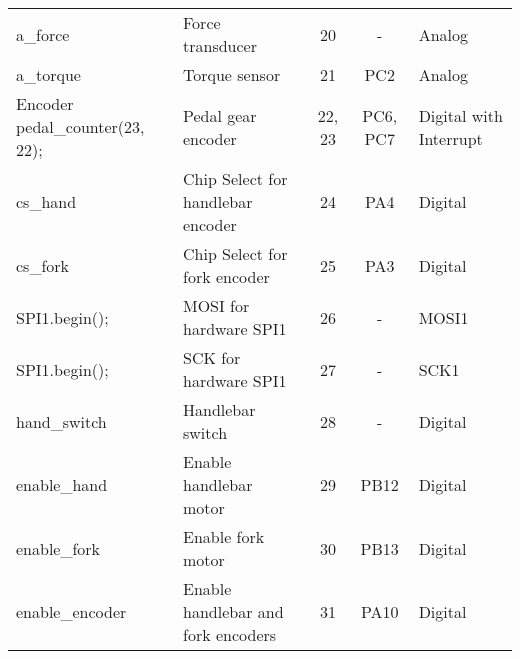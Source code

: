 \begin{table}
{\begin{tabular}{llccl}
a\_force                                               & Force transducer                    & 20                      & -                     & Analog                                                \\
a\_torque                                              & Torque sensor                       & 21                      & PC2                     & Analog                                                \\
Encoder pedal\_counter(23, 22);                        & Pedal gear encoder                  & 22, 23                  & PC6, PC7              & Digital with Interrupt                                \\
cs\_hand                                               & Chip Select for handlebar encoder   & 24                      & PA4                   & Digital                                               \\
cs\_fork                                               & Chip Select for fork encoder        & 25                      & PA3                   & Digital                                               \\
SPI1.begin();                                          & MOSI for hardware SPI1              & 26                      & -                     & MOSI1                                                 \\
SPI1.begin();                                          & SCK for hardware SPI1               & 27                      & -                     & SCK1                                                  \\
hand\_switch                                           & Handlebar switch                    & 28                      & -                     & Digital                                               \\
enable\_hand                                           & Enable handlebar motor              & 29                      & PB12                  & Digital                                               \\
enable\_fork                                           & Enable fork motor                   & 30                      & PB13                  & Digital                                               \\
enable\_encoder                                        & Enable handlebar and fork encoders  & 31                      & PA10                  & Digital                                               \\

\end{tabular}}
\end{table}
